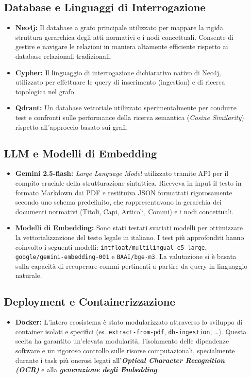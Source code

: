 \subsection*{Database e Linguaggi di Interrogazione}
\begin{itemize}
    \item \textbf{Neo4j:} Il database a grafo principale utilizzato per mappare la rigida struttura gerarchica degli atti normativi e i nodi concettuali.
Consente di gestire e navigare le relazioni in maniera altamente efficiente rispetto ai database relazionali tradizionali.
    \item \textbf{Cypher:} Il linguaggio di interrogazione dichiarativo nativo di Neo4j, utilizzato per effettuare le query di inserimento (ingestion) e di ricerca topologica nel grafo.
    \item \textbf{Qdrant:} Un database vettoriale utilizzato sperimentalmente per condurre test e confronti sulle performance della ricerca semantica (\textit{Cosine Similarity}) rispetto all'approccio basato sui grafi.
\end{itemize}

\subsection*{LLM e Modelli di Embedding}
\begin{itemize}
    \item \textbf{Gemini 2.5-flash:} \textit{Large Language Model} utilizzato tramite API per il compito cruciale della strutturazione sintattica.
    Riceveva in input il testo in formato Markdown dai PDF e restituiva JSON formattati rigorosamente secondo uno schema predefinito, che rappresentavano la gerarchia dei documenti normativi (Titoli, Capi, Articoli, Commi) e i nodi concettuali.
    \item \textbf{Modelli di Embedding:} Sono stati testati svariati modelli per ottimizzare la vettorializzazione del testo legale in italiano. I test più approfonditi hanno coinvolto i seguenti modelli: \texttt{intfloat/multilingual-e5-large}, \texttt{google/gemini-embedding-001} e \texttt{BAAI/bge-m3}. La valutazione si è basata sulla capacità di recuperare commi pertinenti a partire da query in linguaggio naturale.
\end{itemize}


\subsection*{Deployment e Containerizzazione}
\begin{itemize}
    \item \textbf{Docker:} L'intero ecosistema è stato modularizzato attraverso lo sviluppo di container isolati e specifici (es. \texttt{extract-from-pdf}, \texttt{db-ingestion}, \ldots{}). Questa scelta ha garantito un'elevata modularità, l'isolamento delle dipendenze software e un rigoroso controllo sulle risorse computazionali, specialmente durante i task più onerosi legati all'\textbf{\textit{Optical Character Recognition (OCR)}} e alla \textbf{\textit{generazione degli Embedding}}.
\end{itemize}